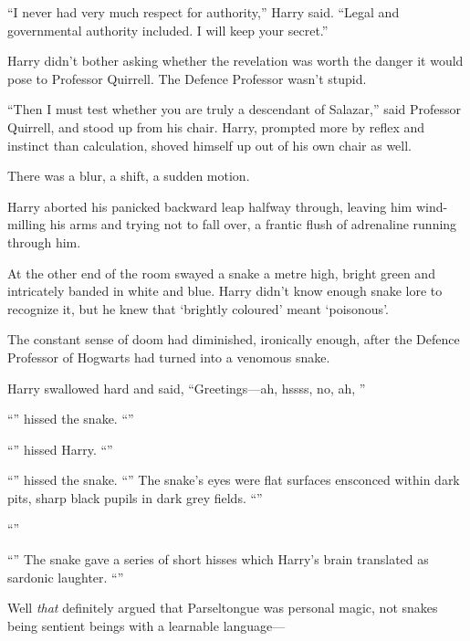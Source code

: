 “I never had very much respect for authority,” Harry said. “Legal and governmental authority included. I will keep your secret.”

Harry didn’t bother asking whether the revelation was worth the danger it would pose to Professor Quirrell. The Defence Professor wasn’t stupid.

“Then I must test whether you are truly a descendant of Salazar,” said Professor Quirrell, and stood up from his chair. Harry, prompted more by reflex and instinct than calculation, shoved himself up out of his own chair as well.

There was a blur, a shift, a sudden motion.

Harry aborted his panicked backward leap halfway through, leaving him wind-milling his arms and trying not to fall over, a frantic flush of adrenaline running through him.

At the other end of the room swayed a snake a metre high, bright green and intricately banded in white and blue. Harry didn’t know enough snake lore to recognize it, but he knew that ‘brightly coloured’ meant ‘poisonous’.

The constant sense of doom had diminished, ironically enough, after the Defence Professor of Hogwarts had turned into a venomous snake.

Harry swallowed hard and said, “Greetings—ah, hssss, no, ah, ”

“” hissed the snake. “”

“” hissed Harry. “”

“” hissed the snake. “” The snake’s eyes were flat surfaces ensconced within dark pits, sharp black pupils in dark grey fields. “”

“”

“” The snake gave a series of short hisses which Harry’s brain translated as sardonic laughter. “”

Well \emph{that} definitely argued that Parseltongue was personal magic, not snakes being sentient beings with a learnable language—

